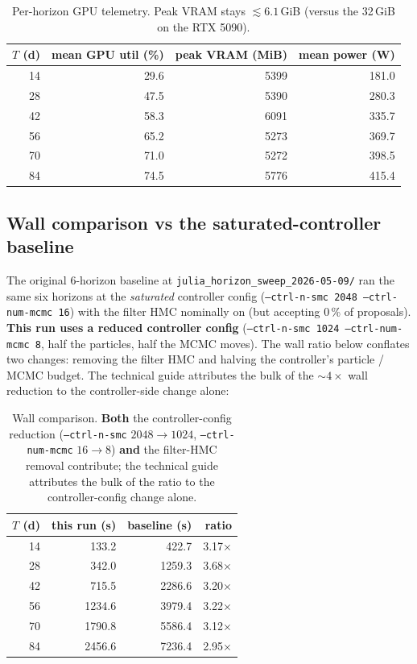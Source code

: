 \documentclass[11pt,a4paper]{article}
\begin{document}
\begin{table}[ht]
\centering
\small
\begin{tabular}{rrrr}
\toprule
$T$ (d) & mean GPU util (\%) & peak VRAM (MiB) & mean power (W) \\
\midrule
14 & 29.6 & 5399 & 181.0 \\
28 & 47.5 & 5390 & 280.3 \\
42 & 58.3 & 6091 & 335.7 \\
56 & 65.2 & 5273 & 369.7 \\
70 & 71.0 & 5272 & 398.5 \\
84 & 74.5 & 5776 & 415.4 \\
\bottomrule
\end{tabular}
\caption{Per-horizon GPU telemetry. Peak VRAM stays $\lesssim 6.1$\,GiB
(versus the 32\,GiB on the RTX 5090).}
\label{tab:gpu}
\end{table}

\subsection{Wall comparison vs the saturated-controller baseline}

The original 6-horizon baseline at
\texttt{julia\_horizon\_sweep\_2026-05-09/} ran the same six
horizons at the \emph{saturated} controller config
(\texttt{--ctrl-n-smc 2048 --ctrl-num-mcmc 16}) with the filter HMC
nominally on (but accepting 0\,\% of proposals). \textbf{This run
uses a reduced controller config} (\texttt{--ctrl-n-smc 1024
--ctrl-num-mcmc 8}, half the particles, half the MCMC moves). The
wall ratio below conflates two changes: removing the filter HMC and
halving the controller's particle / MCMC budget. The technical guide
attributes the bulk of the $\sim 4\times$ wall reduction to the
controller-side change alone:

\begin{table}[ht]
\centering
\small
\begin{tabular}{rrrr}
\toprule
$T$ (d) & this run (s) & baseline (s) & ratio \\
\midrule
14 & 133.2  & 422.7  & 3.17$\times$ \\
28 & 342.0  & 1259.3 & 3.68$\times$ \\
42 & 715.5  & 2286.6 & 3.20$\times$ \\
56 & 1234.6 & 3979.4 & 3.22$\times$ \\
70 & 1790.8 & 5586.4 & 3.12$\times$ \\
84 & 2456.6 & 7236.4 & 2.95$\times$ \\
\bottomrule
\end{tabular}
\caption{Wall comparison. \textbf{Both} the controller-config
reduction (\texttt{--ctrl-n-smc} $2048 \to 1024$,
\texttt{--ctrl-num-mcmc} $16 \to 8$) \textbf{and} the filter-HMC
removal contribute; the technical guide attributes the bulk of the
ratio to the controller-config change alone.}
\label{tab:wall_ratio}
\end{table}
\end{document}

